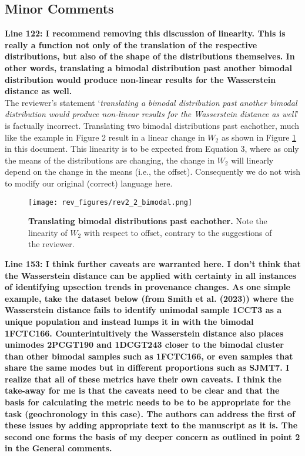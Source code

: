 \documentclass{article}[12p,a4paper]
\begin{document}
\subsection*{Minor Comments}

\textbf{Line 122: I recommend removing this discussion of linearity. This is really a function not only of the translation of the respective distributions, but also of the shape of the distributions themselves. In other words, translating a bimodal distribution past another bimodal distribution would produce non-linear results for the Wasserstein distance as well.}\\

The reviewer's statement `\textit{translating a bimodal distribution past another bimodal distribution would produce non-linear results for the Wasserstein distance as well}' is factually incorrect. Translating two bimodal distributions past eachother, much like the example in Figure 2 result in a linear change in $W_2$ as shown in Figure \ref{fig:bimodal} in this document. This linearity is to be expected from Equation 3, where as only the means of the distributions are changing, the change in $W_2$ will linearly depend on the change in the means (i.e., the offset). Consequently we do not wish to modify our original (correct) language here. \\ 

\begin{figure}
    \centering
    \texttt{[image: rev\_figures/rev2\_2\_bimodal.png]}
    \caption{\textbf{Translating bimodal distributions past eachother.} Note the linearity of $W_2$ with respect to offset, contrary to the suggestions of the reviewer.}
    \label{fig:bimodal}
\end{figure}

\textbf{Line 153: I think further caveats are warranted here. I don’t think that the Wasserstein distance can be applied with certainty in all instances of identifying upsection trends in provenance changes. As one simple example, take the dataset below (from Smith et al. (2023)) where the Wasserstein distance fails to identify unimodal sample 1CCT3 as a unique population and instead lumps it in with the bimodal 1FCTC166. Counterintuitively the Wasserstein distance also places unimodes 2PCGT190 and 1DCGT243 closer to the bimodal cluster than other bimodal samples such as 1FCTC166, or even samples that share the same modes but in different proportions such as SJMT7. I realize that all of these metrics have their own caveats. I think the take-away for me is that the caveats need to be clear and that the basis for calculating the metric needs to be to be appropriate for the task (geochronology in this case). The authors can address the first of these issues by adding appropriate text to the manuscript as it is. The second one forms the basis of my deeper concern as outlined in point 2 in the General comments.}\\
\end{document}
